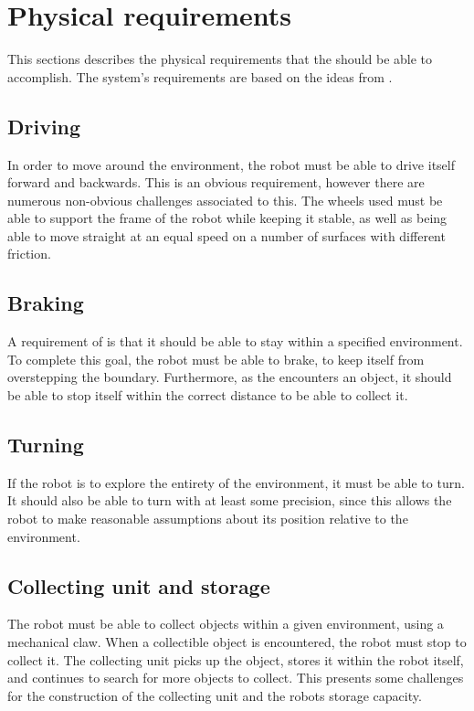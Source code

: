 \section{Physical requirements} \label{sec:physical_requirements}
This sections describes the physical requirements that the \projname{} should be able to accomplish. The system's requirements are based on the ideas from . 

\subsection{Driving}
In order to move around the environment, the robot must be able to drive itself forward and backwards. This is an obvious requirement, however there are numerous non-obvious challenges associated to this. The wheels used must be able to support the frame of the robot while keeping it stable, as well as being able to move straight at an equal speed on a number of surfaces with different friction.

\subsection{Braking}
A requirement of \projname{} is that it should be able to stay within a specified environment. To complete this goal, the robot must be able to brake, to keep itself from overstepping the boundary. Furthermore, as the \projname{} encounters an object, it should be able to stop itself within the correct distance to be able to collect it.

\subsection{Turning}
If the robot is to explore the entirety of the environment, it must be able to turn. It should also be able to turn with at least some precision, since this allows the robot to make reasonable assumptions about its position relative to the environment. 

\subsection{Collecting unit and storage}
The robot must be able to collect objects within a given environment, using a mechanical claw. When a collectible object is encountered, the robot must stop to collect it. The collecting unit picks up the object, stores it within the robot itself, and continues to search for more objects to collect. This presents some challenges for the construction of the collecting unit and the robots storage capacity.

